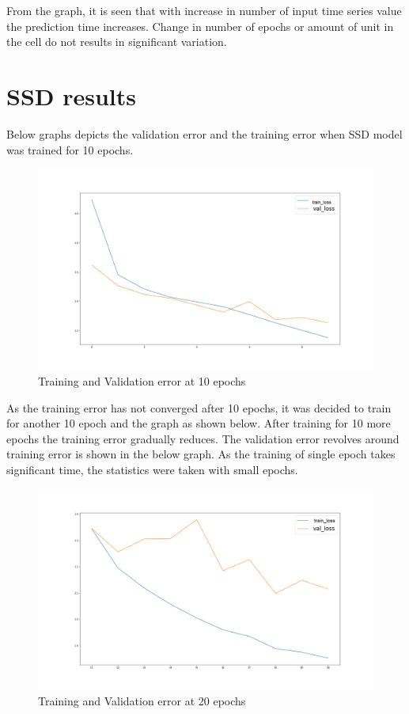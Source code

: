 From the graph, it is seen that with increase in number of input time series value the prediction time increases. Change in number of epochs or amount of unit in the cell do not results in significant variation.

\section{SSD results}
Below graphs depicts the validation error and the training error when SSD model was trained for 10 epochs.
\begin{figure}[H]
\includegraphics[scale=0.4]{conf0_loss-val_loss_0_10epochs}
\begin{center}
\caption{Training and Validation error at 10 epochs}
\end{center}
\end{figure}
As the training error has not converged after 10 epochs, it was decided to train for another 10 epoch and the graph as shown below. After training for 10 more epochs the training error gradually reduces. The validation error revolves around training error is shown in the below graph. As the training of single epoch takes significant time, the statistics were taken with small epochs.

\begin{figure}[H]
\includegraphics[scale=0.4]{conf0_loss-val_loss_10_20epochs}
\begin{center}
\caption{Training and Validation error at 20 epochs}
\end{center}
\end{figure}

